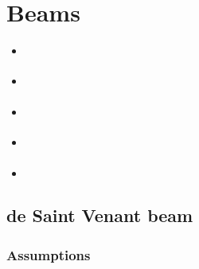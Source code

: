 \documentclass[letterpaper,10pt,english]{jupyterBook}
\begin{document}
\sphinxstepscope


\chapter{Beams}
\label{\detokenize{ch/solids/beams:beams}}\label{\detokenize{ch/solids/beams:solid-mechanics-small-displacements-beams}}\label{\detokenize{ch/solids/beams::doc}}\begin{itemize}
\item {} 
\sphinxAtStartPar
{\hyperref[\detokenize{ch/solids/beams/de-saint-venant:solid-mechanics-small-displacements-beams-de-saint-venant}]{}}

\item {} 
\sphinxAtStartPar
{\hyperref[\detokenize{ch/solids/beams/thin-walled:solid-mechanics-small-displacements-beams-thin-walled}]{}}

\item {} 
\sphinxAtStartPar
{\hyperref[\detokenize{ch/solids/beams/timoshenko:solid-mechanics-small-displacements-beams-timoshenko}]{}}

\item {} 
\sphinxAtStartPar
{\hyperref[\detokenize{ch/solids/beams/bernoulli:solid-mechanics-small-displacements-beams-bernoulli}]{}}

\item {} 
\sphinxAtStartPar
{\hyperref[\detokenize{ch/solids/beams/aeronautical:solid-mechanics-small-displacements-beams-aeronautical}]{}}

\end{itemize}

\sphinxstepscope


\section{de Saint Venant beam}
\label{\detokenize{ch/solids/beams/de-saint-venant:de-saint-venant-beam}}\label{\detokenize{ch/solids/beams/de-saint-venant:solid-mechanics-small-displacements-beams-de-saint-venant}}\label{\detokenize{ch/solids/beams/de-saint-venant::doc}}

\subsection{Assumptions}
\label{\detokenize{ch/solids/beams/de-saint-venant:assumptions}}\label{\detokenize{ch/solids/beams/de-saint-venant:solid-mechanics-small-displacements-beams-de-saint-venant-assumptions}}
\end{document}
